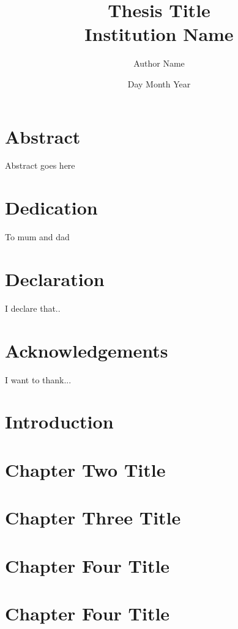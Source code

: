 \documentclass[12pt]{report}
\begin{document}
\title{
	{Thesis Title}\\
	{\large Institution Name}\\
}
\author{Author Name}
\date{Day Month Year}

\maketitle

\chapter*{Abstract}
Abstract goes here

\chapter*{Dedication}
To mum and dad

\chapter*{Declaration}
I declare that..

\chapter*{Acknowledgements}
I want to thank...

\tableofcontents

\chapter{Introduction}


\chapter{Chapter Two Title}


\chapter{Chapter Three Title}


\chapter{Chapter Four Title}


\chapter{Chapter Four Title}

\end{document}
